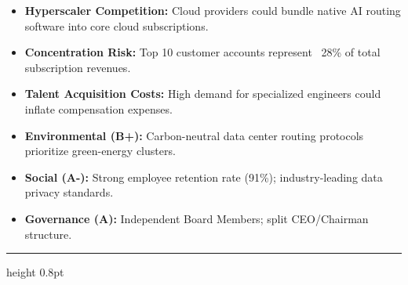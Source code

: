 \documentclass[10pt,a4paper]{scrartcl}
\begin{document}
\begin{minipage}[t]{0.48\textwidth}
    \vspace{0pt}
    \begin{tcolorbox}[calloutbox, title=\textcolor{NavyPrimary}{Key Investment Risks}, colframe=BorderGray, colbacktitle=LightBlueBg, coltitle=NavyPrimary]
        \small
        \begin{itemize}[leftmargin=10pt, itemsep=2pt]
            \item \textbf{Hyperscaler Competition:} Cloud providers could bundle native AI routing software into core cloud subscriptions.
            \item \textbf{Concentration Risk:} Top 10 customer accounts represent ~28\% of total subscription revenues.
            \item \textbf{Talent Acquisition Costs:} High demand for specialized engineers could inflate compensation expenses.
        \end{itemize}
    \end{tcolorbox}
\end{minipage}%
\hfill
\begin{minipage}[t]{0.48\textwidth}
    \vspace{0pt}
    \begin{tcolorbox}[calloutbox, title=\textcolor{NavyPrimary}{ESG \& Governance Overview}, colframe=BorderGray, colbacktitle=LightBlueBg, coltitle=NavyPrimary]
        \small
        \begin{itemize}[leftmargin=10pt, itemsep=2pt]
            \item \textbf{Environmental (B+):} Carbon-neutral data center routing protocols prioritize green-energy clusters.
            \item \textbf{Social (A-):} Strong employee retention rate (91\%); industry-leading data privacy standards.
            \item \textbf{Governance (A):} Independent Board Members; split CEO/Chairman structure.
        \end{itemize}
    \end{tcolorbox}
\end{minipage}

\vspace{10pt}
\hrule height 0.8pt
\vspace{6pt}
\end{document}
